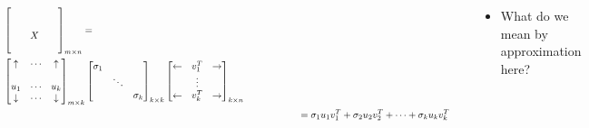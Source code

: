 \begin{frame}
	\begin{columns}
		\begin{overlayarea}{\textwidth}{\textheight}
			\vspace{0.5in}
			\footnotesize{
				\begin{align*}
					\begin{split}
						&\begin{bmatrix}
							  &   &   &   &   \\
							  &   &   &   &   \\
							  &   & X &   &   \\
							  &   &   &   &
						\end{bmatrix}_{m \times n} = \\
						&\begin{bmatrix}
							\uparrow   & \cdots & \uparrow   \\
							           &        &            \\
							u_1        & \cdots & u_k        \\
							\downarrow & \cdots & \downarrow
						\end{bmatrix}_{m \times k}
						\begin{bmatrix}
							\sigma_1 &        &          \\
							         & \ddots &          \\
							         &        & \sigma_k
						\end{bmatrix}_{k \times k}\begin{bmatrix}
							\leftarrow & v_1^T    & \rightarrow \\
							           & \vdots &             \\
							\leftarrow & v_k^T    & \rightarrow
						\end{bmatrix}_{k \times n}
					\end{split} \\
					\vspace{1cm}
					& \hspace{2cm}= \sigma_1 u_1 v_1^T + \sigma_2 u_2 v_2^T + \cdots + \sigma_k u_k v_k^T
				\end{align*}
			}
		\end{overlayarea}
		\begin{overlayarea}{\textwidth}{\textheight}
			\begin{itemize}\justifying
				\item<1-> What do we mean by approximation here?

\end{itemize}
\end{overlayarea}
\end{columns}
\end{frame}
